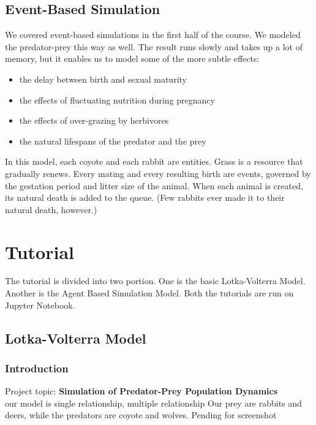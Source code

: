 \documentclass{article}
\begin{document}
\begin{normalsize}
		\subsection{Event-Based Simulation}
		
		We covered event-based simulations in the first half of the course. We modeled the predator-prey this way as well.  The result runs slowly and takes up a lot of memory, but it enables us to model some of the more subtle effects:
		\begin{itemize}
		\item the delay between birth and sexual maturity
		\item the effects of fluctuating nutrition during pregnancy
		\item the effects of over-grazing by herbivores
		\item the natural lifespans of the predator and the prey
		\end{itemize}
		
		In this model, each coyote and each rabbit are entities.  Grass is a resource that gradually renews.  Every mating and every resulting birth are events, governed by the gestation period and litter size of the animal.  When each animal is created, its natural death is added to the queue. (Few rabbits ever made it to their natural death, however.)
	
		\section{Tutorial}
		The tutorial is divided into two portion. One is the basic Lotka-Volterra Model. Another is the Agent Based Simulation Model. Both the tutorials are run on Jupyter Notebook.
		\subsection{Lotka-Volterra Model}
		\subsubsection{Introduction}
		Project topic: \textbf{Simulation of Predator-Prey Population Dynamics }\\
		our model is single relationship, multiple relationship Our prey are rabbits and deers, while the predators are coyote and wolves.
		Pending for screenshot

\end{normalsize}
\end{document}
